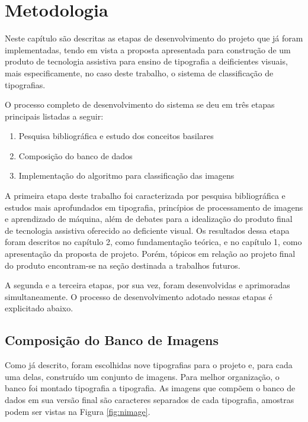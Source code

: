 

\chapter{Metodologia}

Neste capítulo são descritas as etapas de desenvolvimento do projeto que já foram implementadas, tendo em vista a proposta apresentada para construção de um produto de tecnologia assistiva para ensino de tipografia a deificientes visuais, mais especificamente, no caso deste trabalho, o sistema de classificação de tipografias.

O processo completo de desenvolvimento do sistema se deu em três etapas principais listadas a seguir:

\begin{enumerate}
\item Pesquisa bibliográfica e estudo dos conceitos basilares
\item Composição do banco de dados
\item Implementação do algoritmo para classificação das imagens
\end{enumerate}

A primeira etapa deste trabalho foi caracterizada por pesquisa bibliográfica e estudos mais aprofundados em tipografia, princípios de processamento de imagens e aprendizado de máquina, além de debates para a idealização do produto final de tecnologia assistiva oferecido ao deficiente visual. Os resultados dessa etapa foram descritos no capítulo 2, como fundamentação teórica, e no capítulo 1, como apresentação da proposta de projeto. Porém, tópicos em relação ao projeto final do produto encontram-se na seção destinada a trabalhos futuros.

A segunda e a terceira etapas, por sua vez, foram desenvolvidas e aprimoradas simultaneamente. O processo de desenvolvimento adotado nessas etapas é explicitado abaixo.

\section{Composição do Banco de Imagens}

Como já descrito, foram escolhidas nove tipografias para o projeto e, para cada uma delas, construído um conjunto de imagens. Para melhor organização, o banco foi montado tipografia a tipografia. As imagens que compõem o banco de dados em sua versão final são caracteres separados de cada tipografia, amostras podem ser vistas na Figura \ref{fig:nimage}.


